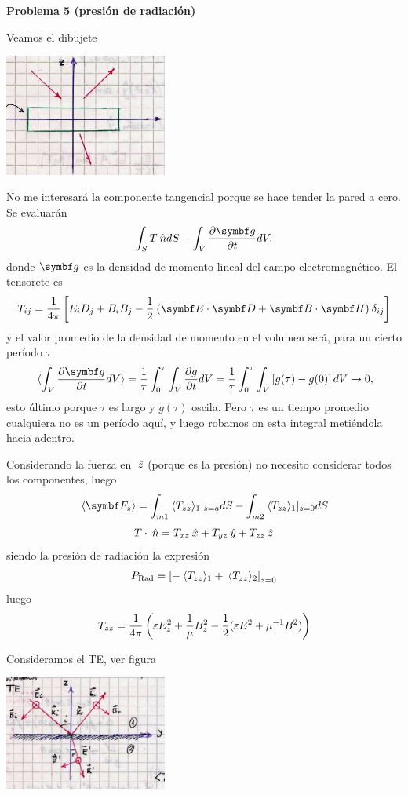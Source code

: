 \documentclass[10pt,oneside]{CBFT_book}
\begin{document}
\begin{ejemplo}{\bf Problema 5 (presión de radiación)}

Veamos el dibujete

\includegraphics[width=0.40\textwidth]{images/fig_ft1_problema5_ondas.jpg}

No me interesará la componente tangencial porque se hace tender la pared a cero.
Se evaluarán
\[
	\int_S T\nver dS - \int_V \dpar{\vb{g}}{t} dV.
\]
donde $\vb{g}$ es la densidad de momento lineal del campo electromagnético.
El tensorete es
\[
	T_{ij} = \frac{1}{4\pi}
	\left[
	E_i D_j + B_i B_j - \frac{1}{2} \: ( \pe{E}{D} + \pe{B}{H} ) \: \delta_{ij}
	\right]
\]
y el valor promedio de la densidad de momento en el volumen será, para un cierto
período $\tau$
\[
	\vm{ \int_V \dpar{\vb{g}}{t} dV } =
	\frac{1}{\tau} \int_0^{\tau} \int_V \dpar{g}{t} dV =
	\frac{1}{\tau} \int_0^{\tau} \int_V \left[ g(\tau) - g(0) \right] dV \to 0,
\]
esto último porque $\tau$ es largo y $g(\tau)$ oscila. Pero $\tau$ es un tiempo promedio
cualquiera no es un período aquí, y luego robamos on esta integral metiéndola hacia adentro.

Considerando la fuerza en $ \:\hat{z} $ (porque es la presión) no necesito considerar todos
los componentes, luego
\[
	\vm{\vb{F}_z} = \int_{m1} \vm{ T_{zz} }_1|_{z=a} dS - 
	\int_{m2} \vm{ T_{zz} }_1|_{z=0} dS
\]
\[
	T \cdot \:\hat{n} = T_{xz} \:\hat{x} + T_{yz} \:\hat{y} + T_{zz} \:\hat{z}
\]
siendo la presión de radiación la expresión
\[
	P_{\text{Rad}} = \left[ - \:\langle  T_{zz}  \rangle_1 + \:\langle  T_{zz}  \rangle_2 \right]_{z=0}
\]
luego
\[
	T_{zz} = \frac{1}{4\pi}\left( 
	\varepsilon E_z^2 + \frac{1}{\mu} B_z^2 - \frac{1}{2}( \varepsilon E^2 + \mu^{-1} B^2 ) 
	\right)
\]
 
Consideramos el TE, ver figura

\includegraphics[width=0.40\textwidth]{images/fig_ft1_problema5_ondasB.jpg}


\end{ejemplo}
\end{document}

